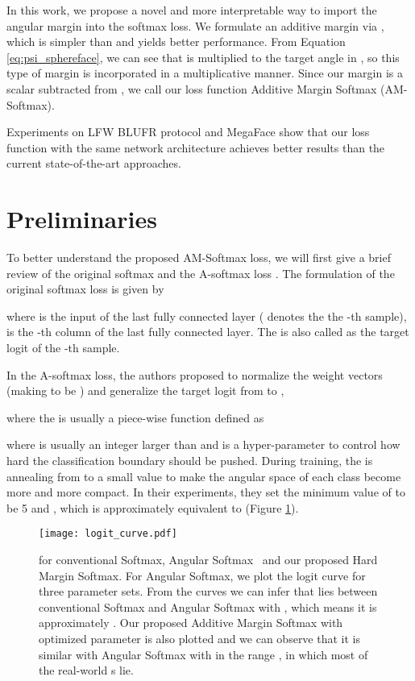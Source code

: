 \documentclass[10pt,twocolumn,letterpaper]{article}
\begin{document}
In this work, we propose a novel and more interpretable way to import the angular margin into the softmax loss. We formulate an additive margin via , which is simpler than \cite{liu2017sphereface} and yields better performance. From Equation \eqref{eq:psi_sphereface}, we can see that  is multiplied to the target angle  in \cite{liu2017sphereface}, so this type of margin is incorporated in a multiplicative manner. Since our margin is a scalar subtracted from , we call our loss function Additive Margin Softmax (AM-Softmax).

Experiments on LFW BLUFR protocol \cite{liao2014benchmark} and MegaFace \cite{kemelmacher2016megaface} show that our loss function with the same network architecture achieves better results than the current state-of-the-art approaches.

\section{Preliminaries}
\label{sec:preliminaries}
To better understand the proposed AM-Softmax loss, we will first give a brief review of the original softmax and the A-softmax loss \cite{liu2017sphereface}. The formulation of the original softmax loss is given by

where  is the input of the last fully connected layer ( denotes the the -th sample),  is the -th column of the last fully connected layer. The  is also called as the target logit \cite{pereyra2017regularizing} of the -th sample.

In the A-softmax loss, the authors proposed to normalize the weight vectors (making  to be ) and generalize the target logit from  to ,

where the  is usually a piece-wise function defined as

where  is usually an integer larger than  and  is a hyper-parameter to control how hard the classification boundary should be pushed. During training, the  is annealing from  to a small value to make the angular space of each class become more and more compact. In their experiments, they set the minimum value of  to be 5 and , which is approximately equivalent to  (Figure \ref{fig:logit_curve}). 

\begin{figure}
	\centering
	\texttt{[image: logit\_curve.pdf]}
	\caption{  for conventional Softmax, Angular Softmax~\cite{liu2017sphereface} and our proposed Hard Margin Softmax. For Angular Softmax, we plot the logit curve for three parameter sets. From the curves we can infer that  lies between conventional Softmax and Angular Softmax with , which means it is approximately . Our proposed Additive Margin Softmax with optimized parameter  is also plotted and we can observe that it is similar with Angular Softmax with  in the range , in which most of the real-world s lie. }
	\label{fig:logit_curve}
\end{figure}
\end{document}

